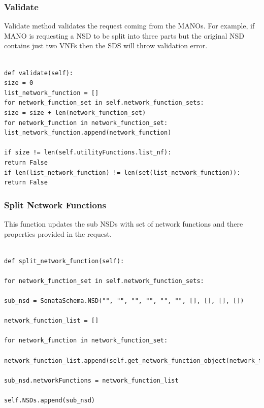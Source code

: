 \subsubsection{Validate} Validate method validates the request coming from the MANOs. For example, if MANO is requesting a NSD to be split into three parts but the original NSD contains just two VNFs then the SDS will throw validation error.

\begin{lstlisting}[caption=Splitting Request Validation, label=lis:validation]

def validate(self):
size = 0
list_network_function = []
for network_function_set in self.network_function_sets:
size = size + len(network_function_set)
for network_function in network_function_set:
list_network_function.append(network_function)

if size != len(self.utilityFunctions.list_nf):
return False
if len(list_network_function) != len(set(list_network_function)):
return False

\end{lstlisting}

\subsubsection{Split Network Functions}
This function updates the sub NSDs with set of network functions and there properties provided in the request.

\begin{lstlisting}[caption=Network Function Splitting, label=lis:NFSplitting]

def split_network_function(self):

for network_function_set in self.network_function_sets:

sub_nsd = SonataSchema.NSD("", "", "", "", "", "", [], [], [], [])

network_function_list = []

for network_function in network_function_set:

network_function_list.append(self.get_network_function_object(network_function))

sub_nsd.networkFunctions = network_function_list

self.NSDs.append(sub_nsd)

\end{lstlisting}

